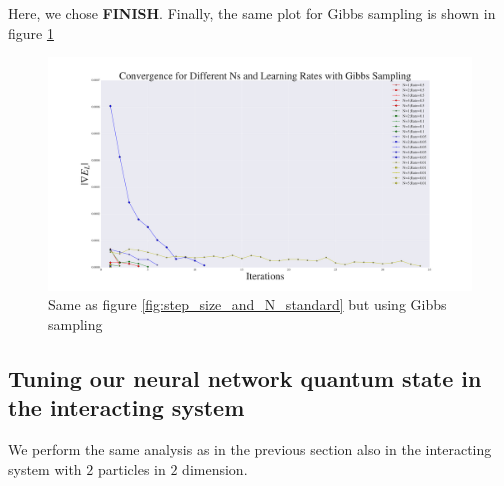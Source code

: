\documentclass[a4paper, 10pt]{article}
\begin{document}
Here, we chose \textbf{FINISH}.
Finally, the same plot for Gibbs sampling is shown in figure \ref{fig:step_size_and_N_gibbs}
\begin{figure}
	\centering
	\includegraphics[width=\textwidth]{../Results/grad_gibbs.pdf}
	\caption{Same as figure \ref{fig:step_size_and_N_standard} but using Gibbs sampling}\label{fig:step_size_and_N_gibbs}
\end{figure}
\subsection{Tuning our neural network quantum state in the interacting system}
We perform the same analysis as in the previous section also in the interacting system with $2$ particles in $2$ dimension. 
\end{document}

